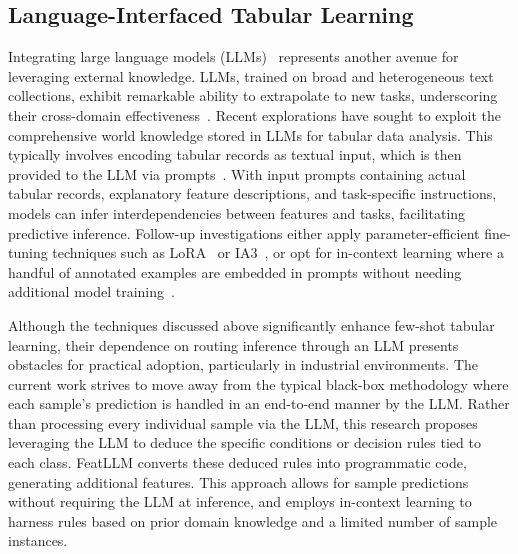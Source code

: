 \subsection{Language-Interfaced Tabular Learning}
Integrating large language models (LLMs)~\cite{anil2023palm,openai2023gpt4} represents another avenue for leveraging external knowledge. LLMs, trained on broad and heterogeneous text collections, exhibit remarkable ability to extrapolate to new tasks, underscoring their cross-domain effectiveness~\cite{brown2020language}. Recent explorations have sought to exploit the comprehensive world knowledge stored in LLMs for tabular data analysis. This typically involves encoding tabular records as textual input, which is then provided to the LLM via prompts~\cite{dinh2022lift,hegselmann2023tabllm,wang2023anypredict}. With input prompts containing actual tabular records, explanatory feature descriptions, and task-specific instructions, models can infer interdependencies between features and tasks, facilitating predictive inference. Follow-up investigations either apply parameter-efficient fine-tuning techniques such as LoRA~\cite{hu2021lora} or IA3~\cite{liu2022few}, or opt for in-context learning where a handful of annotated examples are embedded in prompts without needing additional model training~\cite{dinh2022lift,hegselmann2023tabllm,nam2023semi,slack2023tablet}.

Although the techniques discussed above significantly enhance few-shot tabular learning, their dependence on routing inference through an LLM presents obstacles for practical adoption, particularly in industrial environments. The current work strives to move away from the typical black-box methodology where each sample’s prediction is handled in an end-to-end manner by the LLM. Rather than processing every individual sample via the LLM, this research proposes leveraging the LLM to deduce the specific conditions or decision rules tied to each class. \textsf{FeatLLM} converts these deduced rules into programmatic code, generating additional features. This approach allows for sample predictions without requiring the LLM at inference, and employs in-context learning to harness rules based on prior domain knowledge and a limited number of sample instances.


